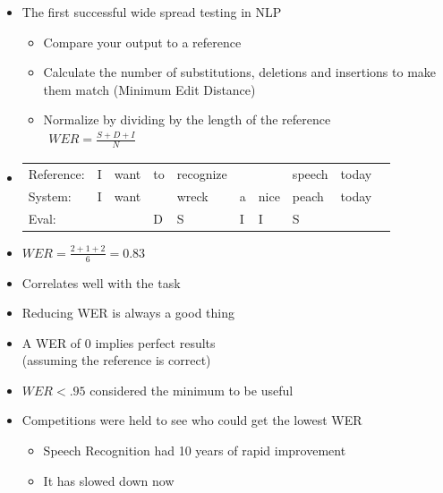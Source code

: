 \documentclass[a4paper,landscape,headrule,footrule,xetex]{foils}
\begin{document}

\begin{itemize}
\item The first successful wide spread testing in NLP
  \begin{itemize}
  \item Compare your output to a reference
  \item Calculate the number of substitutions, deletions and insertions to make them match
(Minimum Edit Distance)
  \item Normalize by dividing by the length of the reference\\[2ex]
    {\Large
    $\begin{array}{lcr}
      WER = \frac{S+D+I}{N}
    \end{array}$
}
  \end{itemize}

\item 
  \begin{tabular}[t]{llllllllll}
    Reference: & I &want &to &recognize&  & &speech & today \\
    System:    & I &want &   &wreck    &a &nice &peach & today\\
    Eval:      &   &     & D   & S       & I & I & S \\
  \end{tabular}
\item $WER=\frac{2+1+2}{6}=0.83$
\end{itemize}



\begin{itemize}
\item Correlates well with the task
\item Reducing WER is always a good thing
\item A WER of 0 implies perfect results
  \\ (assuming the reference is correct)
\item $WER < .95$ considered the minimum to be useful
\item Competitions were held to see who could get the lowest WER
  \begin{itemize}
  \item Speech Recognition had 10 years of rapid improvement
  \item It has slowed down now
  \end{itemize}
\end{itemize}
\end{document}
